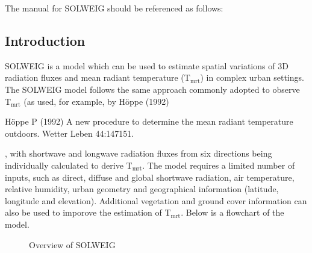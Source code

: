\documentclass[letterpaper,10pt,english]{sphinxmanual}
\begin{document}
The manual for SOLWEIG should be referenced as follows:



\subsection{Introduction}
\label{\detokenize{OtherManuals/SOLWEIG:introduction}}
SOLWEIG is a model which can be used to estimate spatial variations of
3D radiation fluxes and mean radiant temperature (T$_{\text{mrt}}$) in
complex urban settings. The SOLWEIG model follows the same approach
commonly adopted to observe T$_{\text{mrt}}$ (as used, for example, by
Höppe (1992)  %
\begin{footnote}[1]\sphinxAtStartFootnote
Höppe P (1992) A new procedure to determine the mean radiant
temperature outdoors. Wetter Leben 44:147\textendash{}151.
%
\end{footnote}, with shortwave and longwave radiation fluxes from
six directions being individually calculated to derive T$_{\text{mrt}}$.
The model requires a limited number of inputs, such as direct, diffuse
and global shortwave radiation, air temperature, relative humidity,
urban geometry and geographical information (latitude, longitude and
elevation). Additional vegetation and ground cover information can also
be used to imporove the estimation of T$_{\text{mrt}}$. Below is a
flowchart of the model.

\begin{figure}[htbp]
\centering
\capstart

\noindent{}
\caption{Overview of SOLWEIG}\label{\detokenize{OtherManuals/SOLWEIG:id19}}\end{figure}
\end{document}
